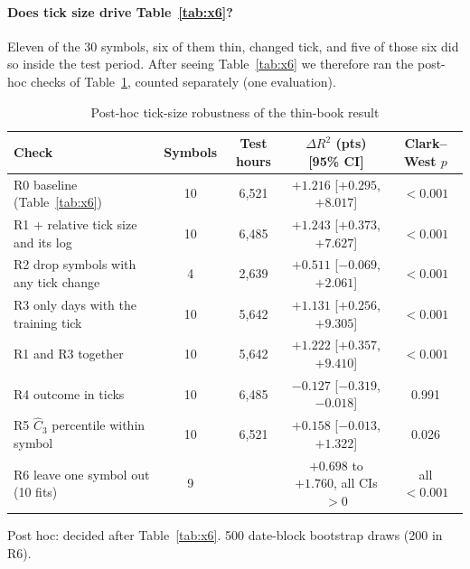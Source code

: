 \documentclass[12pt]{article}
\theoremstyle{definition}
\theoremstyle{remark}
\begin{document}
\paragraph{Does tick size drive Table~\ref{tab:x6}?} Eleven of the 30 symbols, six of them thin, changed tick, and five of those six did so inside the test period. After seeing Table~\ref{tab:x6} we therefore ran the post-hoc checks of Table~\ref{tab:x6r}, counted separately (one evaluation).

\begin{table}[t]\centering\small
\begin{threeparttable}
\caption{Post-hoc tick-size robustness of the thin-book result}\label{tab:x6r}
\setlength{\tabcolsep}{3pt}
\begin{tabular}{p{}cccc}
\toprule
Check & Symbols & Test hours & $\Delta R^2$ (pts) [95\% CI] & Clark--West $p$\\
\midrule
R0 baseline (Table~\ref{tab:x6}) & 10 & 6{,}521 & $+1.216$ [$+0.295$, $+8.017$] & $<0.001$\\
R1 + relative tick size and its log & 10 & 6{,}485 & $+1.243$ [$+0.373$, $+7.627$] & $<0.001$\\
R2 drop symbols with any tick change & 4 & 2{,}639 & $+0.511$ [$-0.069$, $+2.061$] & $<0.001$\\
R3 only days with the training tick & 10 & 5{,}642 & $+1.131$ [$+0.256$, $+9.305$] & $<0.001$\\
R1 and R3 together & 10 & 5{,}642 & $+1.222$ [$+0.357$, $+9.410$] & $<0.001$\\
R4 outcome in ticks & 10 & 6{,}485 & $-0.127$ [$-0.319$, $-0.018$] & 0.991\\
R5 $\hat C_3$ percentile within symbol & 10 & 6{,}521 & $+0.158$ [$-0.013$, $+1.322$] & 0.026\\
R6 leave one symbol out (10 fits) & 9 & & $+0.698$ to $+1.760$, all CIs $>0$ & all $<0.001$\\
\bottomrule
\end{tabular}
\begin{tablenotes}\footnotesize\item Post hoc: decided after Table~\ref{tab:x6}. 500 date-block bootstrap draws (200 in R6). \end{tablenotes}
\end{threeparttable}
\end{table}
\end{document}
